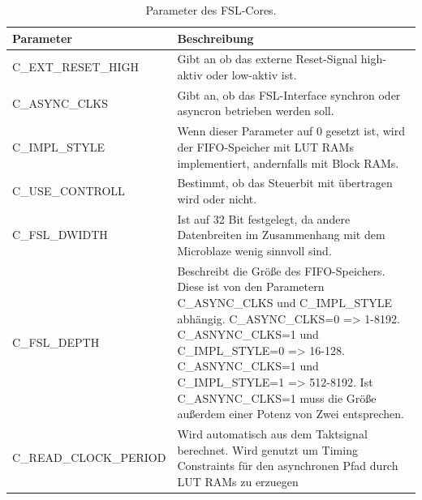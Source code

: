 \begin{table}[ht!]
	\begin{tabular}{|l|p{10cm}|}
		\hline \textbf{Parameter} & \textbf{Beschreibung} \\ 
		\hline C\_EXT\_RESET\_HIGH & Gibt an ob das externe Reset-Signal high-aktiv oder low-aktiv ist.\\ 
		\hline C\_ASYNC\_CLKS & Gibt an, ob das FSL-Interface synchron oder asyncron betrieben werden soll.\\ 
		\hline C\_IMPL\_STYLE & Wenn dieser Parameter auf 0 gesetzt ist, wird der FIFO-Speicher mit LUT RAMs implementiert, andernfalls mit Block RAMs.   \\ 
		\hline C\_USE\_CONTROLL & Bestimmt, ob das Steuerbit mit übertragen wird oder nicht.\\ 
		\hline C\_FSL\_DWIDTH & Ist auf 32 Bit festgelegt, da andere Datenbreiten im Zusammenhang mit dem Microblaze wenig sinnvoll sind. \\ 
		\hline C\_FSL\_DEPTH & Beschreibt die Größe des FIFO-Speichers. Diese ist von den Parametern C\_ASYNC\_CLKS und C\_IMPL\_STYLE abhängig. C\_ASYNC\_CLKS=0 => 1-8192. C\_ASNYNC\_CLKS=1 und C\_IMPL\_STYLE=0 => 16-128. C\_ASNYNC\_CLKS=1 und C\_IMPL\_STYLE=1 => 512-8192. Ist C\_ASNYNC\_CLKS=1 muss die Größe außerdem einer Potenz von Zwei entsprechen.\\ 
		\hline C\_READ\_CLOCK\_PERIOD & Wird automatisch aus dem Taktsignal berechnet. Wird genutzt um Timing Constraints für den asynchronen Pfad durch LUT RAMs zu erzuegen \\
		\hline 
	\end{tabular}
	\centering
	\caption{Parameter des FSL-Cores.}
	\label{tab:FSLParam}
\end{table}

